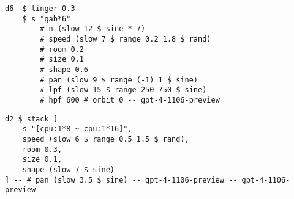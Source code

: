 \begin{minipage}[t]{1\textwidth}
    \centering
    \begin{lstlisting}[style=SuperCollider-IDE, language=ExtendedHaskell, basicstyle=\footnotesize\ttfamily, numbers=none]
d6  $ linger 0.3 
    $ s "gab*6" 
        # n (slow 12 $ sine * 7) 
        # speed (slow 7 $ range 0.2 1.8 $ rand) 
        # room 0.2 
        # size 0.1 
        # shape 0.6 
        # pan (slow 9 $ range (-1) 1 $ sine) 
        # lpf (slow 15 $ range 250 750 $ sine) 
        # hpf 600 # orbit 0 -- gpt-4-1106-preview
    \end{lstlisting}
    \vspace{1cm}
\end{minipage}





\begin{minipage}[t]{1\textwidth}
    \centering
    \begin{lstlisting}[style=SuperCollider-IDE, language=ExtendedHaskell, basicstyle=\footnotesize\ttfamily, numbers=none]
d2 $ stack [
    s "[cpu:1*8 ~ cpu:1*16]",
    speed (slow 6 $ range 0.5 1.5 $ rand),
    room 0.3,
    size 0.1,
    shape (slow 7 $ sine)
] -- # pan (slow 3.5 $ sine) -- gpt-4-1106-preview -- gpt-4-1106-preview
    \end{lstlisting}
    \vspace{1cm}
\end{minipage}







